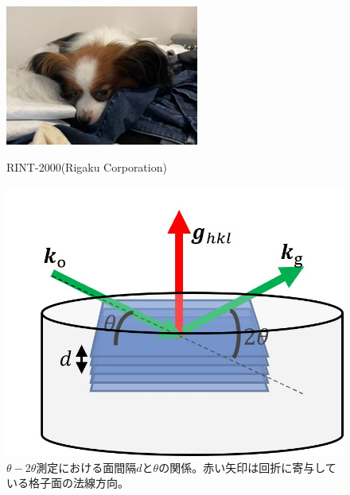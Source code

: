 \documentclass[dvipdfmx,12pt,a4paper]{jreport}
\begin{document}
			\begin{figure}[h]
				\centering
				\begin{minipage}{0.45\hsize}
					\centering
					\includegraphics[width=0.9\linewidth]{sora.jpg}
					\caption{RINT-2000(Rigaku Corporation)}
					\label{XRD_nakajima}
				\end{minipage}
				\begin{minipage}{0.45\hsize}
					\centering
					\includegraphics[scale=0.9]{theta_2theta.jpg}
					\caption{$\theta-2\theta$測定における面間隔$d$と$\theta$の関係。赤い矢印は回折に寄与している格子面の法線方向。}
					\label{XRD_theta_2theta}
				\end{minipage}
			\end{figure}
			
\end{document}
